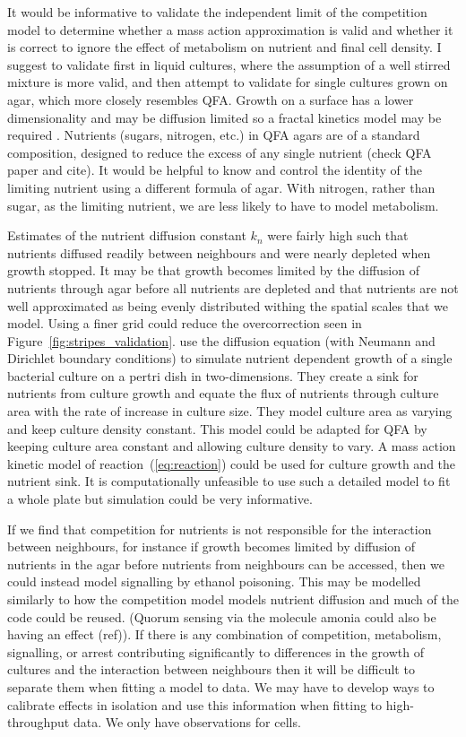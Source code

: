 It would be informative to validate the independent limit of the
competition model to determine whether a mass action approximation is
valid and whether it is correct to ignore the effect of metabolism on
nutrient and final cell density. I suggest to validate first in liquid
cultures, where the assumption of a well stirred mixture is more
valid, and then attempt to validate for single cultures grown on agar,
which more closely resembles QFA. Growth on a surface has a lower
dimensionality and may be diffusion limited so a fractal kinetics
model may be required \citep{Kopelman1988,savageau1995}. Nutrients
(sugars, nitrogen, etc.) in QFA agars are of a standard composition,
designed to reduce the excess of any single nutrient (check QFA paper
and cite). It would be helpful to know and control the identity of the
limiting nutrient using a different formula of agar. With nitrogen,
rather than sugar, as the limiting nutrient, we are less likely to
have to model metabolism.


Estimates of the nutrient diffusion constant \(k_{n}\) were fairly
high such that nutrients diffused readily between neighbours and were
nearly depleted when growth stopped. It may be that growth becomes
limited by the diffusion of nutrients through agar before all
nutrients are depleted and that nutrients are not well approximated as
being evenly distributed withing the spatial scales that we
model. Using a finer grid could reduce the overcorrection seen in
Figure~\ref{fig:stripes_validation}. \citet{Reo2014} use the diffusion
equation (with Neumann and Dirichlet boundary conditions) to simulate
nutrient dependent growth of a single bacterial culture on a pertri
dish in two-dimensions. They create a sink for nutrients from culture
growth and equate the flux of nutrients through culture area with the
rate of increase in culture size. They model culture area as varying
and keep culture density constant. This model could be adapted for QFA
by keeping culture area constant and allowing culture density to
vary. A mass action kinetic model of reaction~(\ref{eq:reaction})
could be used for culture growth and the nutrient sink. It is
computationally unfeasible to use such a detailed model to fit a whole
plate but simulation could be very informative.

If we find that competition for nutrients is not responsible for the
interaction between neighbours, for instance if growth becomes limited
by diffusion of nutrients in the agar before nutrients from neighbours
can be accessed, then we could instead model signalling by ethanol
poisoning. This may be modelled similarly to how the competition model
models nutrient diffusion and much of the code could be reused.
(Quorum sensing via the molecule amonia could also be having an effect
(ref)). If there is any combination of competition, metabolism,
signalling, or arrest contributing significantly to differences in the
growth of cultures and the interaction between neighbours then it will
be difficult to separate them when fitting a model to data. We may
have to develop ways to calibrate effects in isolation and use this
information when fitting to high-throughput data. We only have
observations for cells.


